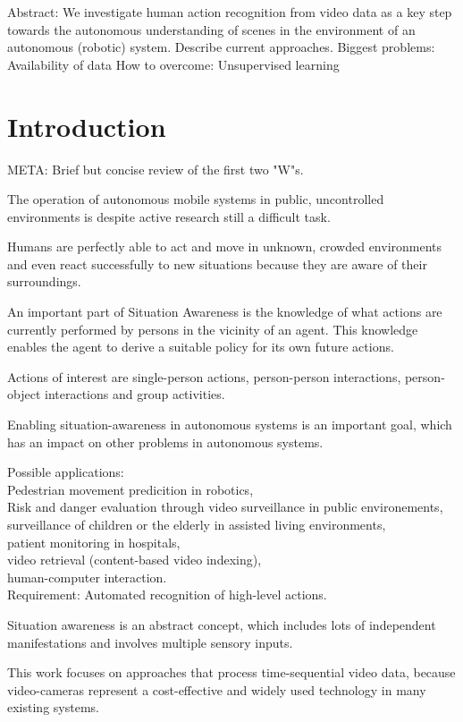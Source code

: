 Abstract:
We investigate human action recognition from video data as a key step towards the autonomous understanding of scenes in the environment of an autonomous (robotic) system.
Describe current approaches.
Biggest problems: Availability of data
How to overcome: Unsupervised learning


\section{Introduction}
META: Brief but concise review of the first two "W"s.

The operation of autonomous mobile systems in public, uncontrolled environments is despite active research still a difficult task.

Humans are perfectly able to act and move in unknown, crowded environments and even react successfully to new situations because they are aware of their surroundings.

An important part of Situation Awareness is the knowledge of what actions are currently performed by persons in the vicinity of an agent.
This knowledge enables the agent to derive a suitable policy for its own future actions.

Actions of interest are single-person actions, person-person interactions, person-object interactions and group activities.

Enabling situation-awareness in autonomous systems is an important goal, which has an impact on other problems in autonomous systems.

Possible applications:\\
Pedestrian movement predicition in robotics,\\
Risk and danger evaluation through video surveillance in public environements,\\
surveillance of children or the elderly in assisted living environments,\\
patient monitoring in hospitals,\\
video retrieval (content-based video indexing),\\
human-computer interaction.\\

Requirement: Automated recognition of high-level actions.

Situation awareness is an abstract concept, which includes lots of independent manifestations and involves multiple sensory inputs.

This work focuses on approaches that process time-sequential video data, because video-cameras represent a cost-effective and widely used technology in many existing systems.

